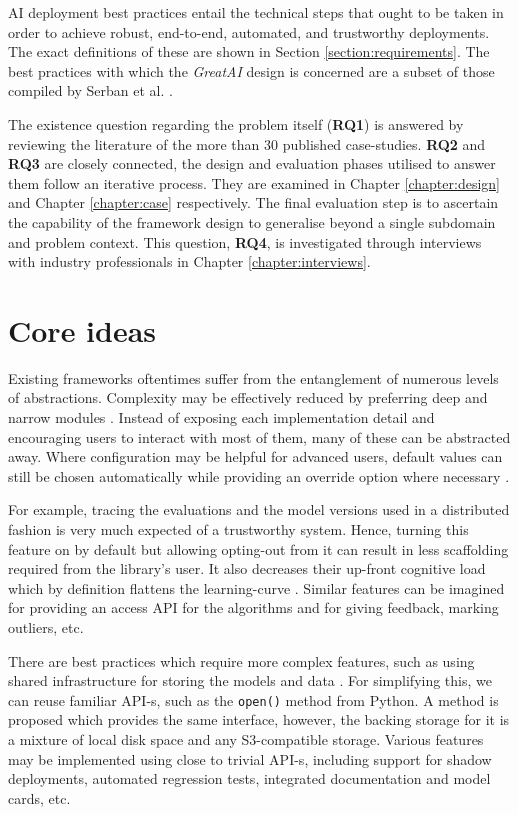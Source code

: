 AI deployment best practices entail the technical steps that ought to be taken in order to achieve robust, end-to-end, automated, and trustworthy deployments. The exact definitions of these are shown in Section \ref{section:requirements}. The best practices with which the \textit{GreatAI} design is concerned are a subset of those compiled by Serban et al. \cite{serban2020adoption}.

The existence question regarding the problem itself (\textbf{RQ1}) is answered by reviewing the literature of the more than 30 published case-studies. \textbf{RQ2} and \textbf{RQ3} are closely connected, the design and evaluation phases utilised to answer them follow an iterative process. They are examined in Chapter \ref{chapter:design} and Chapter \ref{chapter:case} respectively. The final evaluation step is to ascertain the capability of the framework design to generalise beyond a single subdomain and problem context. This question, \textbf{RQ4}, is investigated through interviews with industry professionals in Chapter \ref{chapter:interviews}.

\section{Core ideas}

Existing frameworks oftentimes suffer from the entanglement of numerous levels of abstractions. Complexity may be effectively reduced by preferring deep and narrow modules \cite{ousterhout2018philosophy}. Instead of exposing each implementation detail and encouraging users to interact with most of them, many of these can be abstracted away. Where configuration may be helpful for advanced users, default values can still be chosen automatically while providing an override option where necessary \cite{ousterhout2018philosophy,hermans2021programmer}. 

For example, tracing the evaluations and the model versions used in a distributed fashion is very much expected of a trustworthy system. Hence, turning this feature on by default but allowing opting-out from it can result in less scaffolding required from the library's user. It also decreases their up-front cognitive load which by definition flattens the learning-curve \cite{hermans2021programmer}. Similar features can be imagined for providing an access API for the algorithms and for giving feedback, marking outliers, etc.

There are best practices which require more complex features, such as using shared infrastructure for storing the models and data \cite{serban2020adoption}. For simplifying this, we can reuse familiar API-s, such as the \texttt{open()} method from Python. A method is proposed which provides the same interface, however, the backing storage for it is a mixture of local disk space and any S3-compatible storage. Various features may be implemented using close to trivial API-s, including support for shadow deployments, automated regression tests, integrated documentation and model cards, etc.


